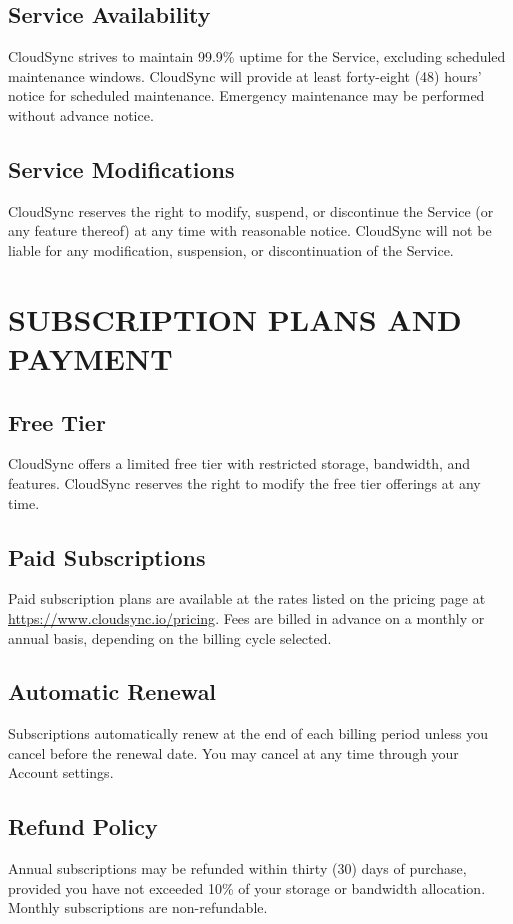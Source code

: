 \documentclass[
    language=english,
    doctype=terms-of-service,
    institution=none,
]{../../omnilatex}
\begin{document}
\subsection{Service Availability}
CloudSync strives to maintain 99.9\% uptime for the Service, excluding scheduled maintenance windows. CloudSync will provide at least forty-eight (48) hours' notice for scheduled maintenance. Emergency maintenance may be performed without advance notice.

\subsection{Service Modifications}
CloudSync reserves the right to modify, suspend, or discontinue the Service (or any feature thereof) at any time with reasonable notice. CloudSync will not be liable for any modification, suspension, or discontinuation of the Service.

\section{SUBSCRIPTION PLANS AND PAYMENT}

\subsection{Free Tier}
CloudSync offers a limited free tier with restricted storage, bandwidth, and features. CloudSync reserves the right to modify the free tier offerings at any time.

\subsection{Paid Subscriptions}
Paid subscription plans are available at the rates listed on the pricing page at \url{https://www.cloudsync.io/pricing}. Fees are billed in advance on a monthly or annual basis, depending on the billing cycle selected.

\subsection{Automatic Renewal}
Subscriptions automatically renew at the end of each billing period unless you cancel before the renewal date. You may cancel at any time through your Account settings.

\subsection{Refund Policy}
Annual subscriptions may be refunded within thirty (30) days of purchase, provided you have not exceeded 10\% of your storage or bandwidth allocation. Monthly subscriptions are non-refundable.
\end{document}
